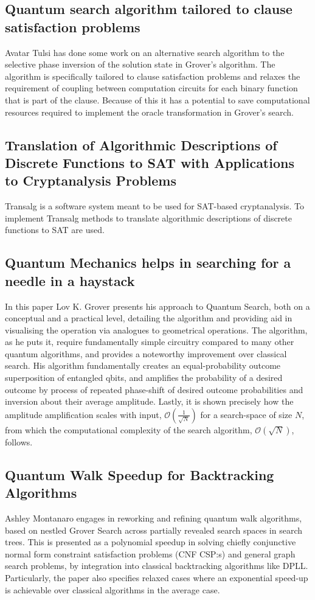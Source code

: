 \documentclass[msc,lith,english]{liuthesis}
\begin{document}
\subsection{Quantum search algorithm tailored to clause satisfaction problems}
Avatar Tulsi has done some work on an alternative search algorithm to the selective phase inversion of the solution state in Grover's algorithm. The algorithm is specifically tailored to clause satisfaction problems and relaxes the requirement of coupling between computation circuits for each binary function that is part of the clause. Because of this it has a potential to save computational resources required to implement the oracle transformation in Grover's search.\cite{QuantumCSPSearch}

\subsection{Translation of Algorithmic Descriptions of Discrete Functions to SAT with Applications to Cryptanalysis Problems}
Transalg is a software system meant to be used for SAT-based cryptanalysis. To implement Transalg methods to translate algorithmic descriptions of discrete functions to SAT are used.\cite{Transalg}

\subsection{Quantum Mechanics helps in searching for a needle in a haystack
}
In this paper Lov K. Grover presents his approach to Quantum Search, both on a conceptual and a practical level, detailing the algorithm and providing aid in visualising the operation via analogues to geometrical operations. The algorithm, as he puts it, require fundamentally simple circuitry compared to many other quantum algorithms, and provides a noteworthy improvement over classical search. His algorithm fundamentally creates an equal-probability outcome superposition of entangled qbits, and amplifies the probability of a desired outcome by process of repeated phase-shift of desired outcome probabilities and inversion about their average amplitude. Lastly, it is shown precisely how the amplitude amplification scales with input, $\mathcal{O}(\frac{1}{\sqrt{N}})$ for a search-space of size $N$, from which the computational complexity of the search algorithm, $\mathcal{O}(\sqrt{N})$, follows.\cite{QMHSNH}

\subsection{Quantum Walk Speedup for Backtracking Algorithms}
Ashley Montanaro engages in reworking and refining quantum walk algorithms, based on nestled Grover Search across partially revealed search spaces in search trees. This is presented as a polynomial speedup in solving chiefly conjunctive normal form constraint satisfaction problems (CNF CSP:s) and general graph search problems, by integration into classical backtracking algorithms like DPLL. Particularly, the paper also specifies relaxed cases where an exponential speed-up is achievable over classical algorithms in the average case.\cite{QWSBA}
\end{document}
